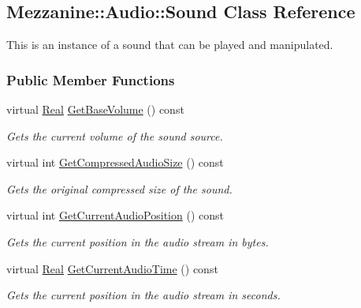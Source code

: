 \hypertarget{classMezzanine_1_1Audio_1_1Sound}{
\subsection{Mezzanine::Audio::Sound Class Reference}
\label{classMezzanine_1_1Audio_1_1Sound}
}


This is an instance of a sound that can be played and manipulated.  


\subsubsection*{Public Member Functions}
\begin{DoxyCompactItemize}
\item 
virtual \hyperlink{namespaceMezzanine_a726731b1a7df72bf3583e4a97282c6f6}{Real} \hyperlink{classMezzanine_1_1Audio_1_1Sound_a59858396263b2f14fa937ff7c10011d7}{GetBaseVolume} () const 
\begin{DoxyCompactList}\small\item\em Gets the current volume of the sound source. \item\end{DoxyCompactList}\item 
virtual int \hyperlink{classMezzanine_1_1Audio_1_1Sound_ac6a79c5326a7a36b39f86604b62ccf98}{GetCompressedAudioSize} () const 
\begin{DoxyCompactList}\small\item\em Gets the original compressed size of the sound. \item\end{DoxyCompactList}\item 
virtual int \hyperlink{classMezzanine_1_1Audio_1_1Sound_abba56b18b9bb7b65cc712b4093e87ab5}{GetCurrentAudioPosition} () const 
\begin{DoxyCompactList}\small\item\em Gets the current position in the audio stream in bytes. \item\end{DoxyCompactList}\item 
virtual \hyperlink{namespaceMezzanine_a726731b1a7df72bf3583e4a97282c6f6}{Real} \hyperlink{classMezzanine_1_1Audio_1_1Sound_ad5ddf0b36c1ca5222a12dd64fa38e0ae}{GetCurrentAudioTime} () const 
\begin{DoxyCompactList}\small\item\em Gets the current position in the audio stream in seconds. \item\end{DoxyCompactList}\item 

\end{DoxyCompactItemize}
